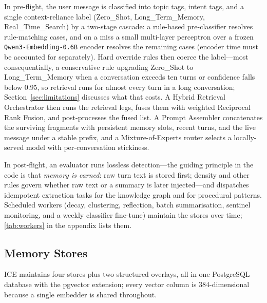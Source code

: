 \documentclass[11pt,a4paper]{article}
\begin{document}
In pre-flight, the user message is classified into topic tags, intent tags, and a single context-reliance label (Zero\_Shot, Long\_Term\_Memory, Real\_Time\_Search) by a two-stage cascade: a rule-based pre-classifier resolves rule-matching cases, and on a miss a small multi-layer perceptron over a frozen \texttt{Qwen3-Embedding-0.6B} encoder resolves the remaining cases (encoder time must be accounted for separately). Hard override rules then coerce the label---most consequentially, a conservative rule upgrading Zero\_Shot to Long\_Term\_Memory when a conversation exceeds ten turns or confidence falls below 0.95, so retrieval runs for almost every turn in a long conversation; Section~\ref{sec:limitations} discusses what that costs. A Hybrid Retrieval Orchestrator then runs the retrieval legs, fuses them with weighted Reciprocal Rank Fusion, and post-processes the fused list. A Prompt Assembler concatenates the surviving fragments with persistent memory slots, recent turns, and the live message under a stable prefix, and a Mixture-of-Experts router selects a locally-served model with per-conversation stickiness.

In post-flight, an evaluator runs lossless detection---the guiding principle in the code is that \emph{memory is earned}: raw turn text is stored first; density and other rules govern whether raw text or a summary is later injected---and dispatches idempotent extraction tasks for the knowledge graph and for procedural patterns. Scheduled workers (decay, clustering, reflection, batch summarisation, sentinel monitoring, and a weekly classifier fine-tune) maintain the stores over time; \cref{tab:workers} in the appendix lists them.

\subsection{Memory Stores}

ICE maintains four stores plus two structured overlays, all in one PostgreSQL database with the pgvector extension; every vector column is 384-dimensional because a single embedder is shared throughout.
\end{document}
